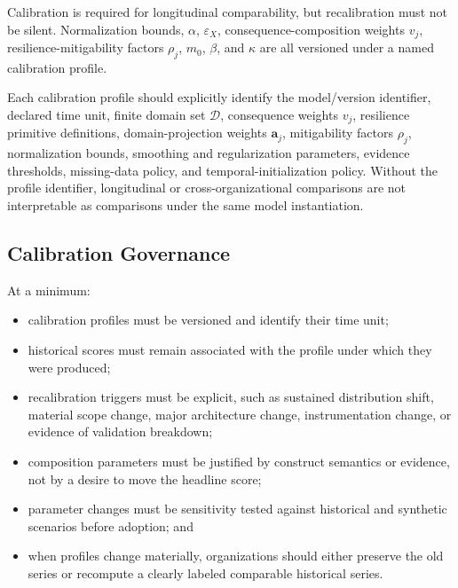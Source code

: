 \documentclass[11pt]{article}
\begin{document}
Calibration is required for longitudinal comparability, but recalibration must not be
silent. Normalization bounds, $\alpha$, $\varepsilon_X$, consequence-composition weights
$v_j$, resilience-mitigability factors $\rho_j$, $m_0$, $\beta$, and $\kappa$ are all
versioned under a named calibration profile.

Each calibration profile should explicitly identify the model/version identifier, declared
time unit, finite domain set $\mathcal{D}$, consequence weights $v_j$, resilience
primitive definitions, domain-projection weights $\mathbf{a}_j$, mitigability factors
$\rho_j$, normalization bounds, smoothing and regularization parameters, evidence
thresholds, missing-data policy, and temporal-initialization policy. Without the profile
identifier, longitudinal or cross-organizational comparisons are not interpretable as
comparisons under the same model instantiation.

\subsection{Calibration Governance}
At a minimum:
\begin{itemize}
  \item calibration profiles must be versioned and identify their time unit;
  \item historical scores must remain associated with the profile under which they were
    produced;
  \item recalibration triggers must be explicit, such as sustained distribution shift,
    material scope change, major architecture change, instrumentation change, or
    evidence of validation breakdown;
  \item composition parameters must be justified by construct semantics or evidence, not
    by a desire to move the headline score;
  \item parameter changes must be sensitivity tested against historical and synthetic
    scenarios before adoption; and
  \item when profiles change materially, organizations should either preserve the old
    series or recompute a clearly labeled comparable historical series.
\end{itemize}
\end{document}
